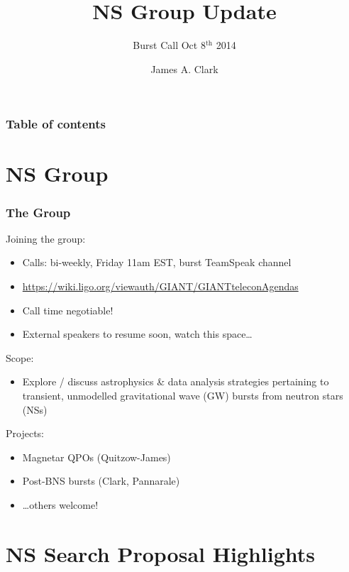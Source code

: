 \documentclass{beamer}
\def\gw#1{gravitational wave#1 (GW#1)\gdef\gw{GW}}
\def\ns#1{neutron star#1 (NS#1)\gdef\ns{NS}}
\begin{document}
\title{NS Group Update}
\subtitle{Burst Call Oct 8$^{\text{th}}$ 2014}  
\author{James A. Clark}
\date{} 

\begin{frame}[plain]
\titlepage
\end{frame}

\begin{frame}\frametitle{Table of contents}\tableofcontents
\end{frame} 

\section{NS Group}

\begin{frame}
    \frametitle{The Group}
    Joining the group:
    \begin{itemize}
        \item Calls: bi-weekly, Friday 11am EST, burst TeamSpeak channel
        \item
            {\small\href{https://wiki.ligo.org/viewauth/GIANT/GIANTteleconAgendas}
            {https://wiki.ligo.org/viewauth/GIANT/GIANTteleconAgendas}}
        \item Call time negotiable!
        \item External speakers to resume soon, watch this space\dots
    \end{itemize}
    Scope:
    \begin{itemize}
        \item Explore / discuss astrophysics \& data analysis strategies
            pertaining to transient, unmodelled \gw{} bursts from \ns{s}
    \end{itemize}
    Projects:
    \begin{itemize}
        \item Magnetar QPOs (Quitzow-James)
        \item Post-BNS bursts (Clark, Pannarale)
        \item \dots others welcome!
    \end{itemize}
\end{frame}

\section{NS Search Proposal Highlights}
\end{document}
